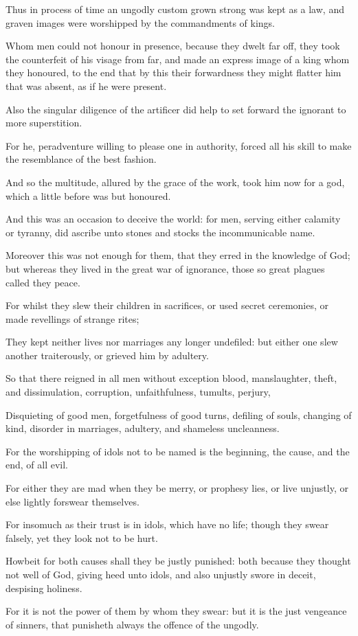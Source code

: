 {\par }{\PP {}Thus in process of time an ungodly custom grown strong was kept as a law, and graven images were worshipped by the commandments of kings.
\par }{\PP {}Whom men could not honour in presence, because they dwelt far off, they took the counterfeit of his visage from far, and made an express image of a king whom they honoured, to the end that by this their forwardness they might flatter him that was absent, as if he were present.
\par }{\PP {}Also the singular diligence of the artificer did help to set forward the ignorant to more superstition.
\par }{\PP {}For he, peradventure willing to please one in authority, forced all his skill to make the resemblance of the best fashion.
\par }{\PP {}And so the multitude, allured by the grace of the work, took him now for a god, which a little before was but honoured.
\par }{\PP {}And this was an occasion to deceive the world: for men, serving either calamity or tyranny, did ascribe unto stones and stocks the incommunicable name.
\par }{\PP {}Moreover this was not enough for them, that they erred in the knowledge of God; but whereas they lived in the great war of ignorance, those so great plagues called they peace.
\par }{\PP {}For whilst they slew their children in sacrifices, or used secret ceremonies, or made revellings of strange rites;
\par }{\PP {}They kept neither lives nor marriages any longer undefiled: but either one slew another traiterously, or grieved him by adultery.
\par }{\PP {}So that there reigned in all men without exception blood, manslaughter, theft, and dissimulation, corruption, unfaithfulness, tumults, perjury,
\par }{\PP {}Disquieting of good men, forgetfulness of good turns, defiling of souls, changing of kind, disorder in marriages, adultery, and shameless uncleanness.
\par }{\PP {}For the worshipping of idols not to be named is the beginning, the cause, and the end, of all evil.
\par }{\PP {}For either they are mad when they be merry, or prophesy lies, or live unjustly, or else lightly forswear themselves.
\par }{\PP {}For insomuch as their trust is in idols, which have no life; though they swear falsely, yet they look not to be hurt.
\par }{\PP {}Howbeit for both causes shall they be justly punished: both because they thought not well of God, giving heed unto idols, and also unjustly swore in deceit, despising holiness.
\par }{\PP {}For it is not the power of them by whom they swear: but it is the just vengeance of sinners, that punisheth always the offence of the ungodly.

}

